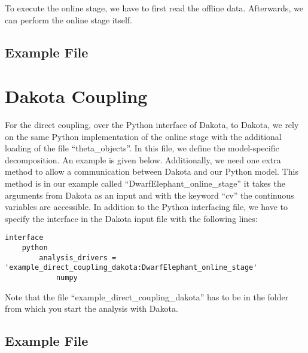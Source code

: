 \documentclass[11pt, a4paper, DIV=14]{scrartcl}
\begin{document}
To execute the online stage, we have to first read the offline data. Afterwards, we can perform the online stage itself.

\subsection{Example File}


\section{Dakota Coupling}
For the direct coupling, over the Python interface of Dakota, to Dakota, we rely on the same Python implementation of the online stage with the additional loading of the file ``theta\_objects''.  In this file, we define the model-specific decomposition. An example is given below. Additionally, we need one extra method to allow a communication between Dakota and our Python model. This method is in our example called ``DwarfElephant\_online\_stage'' it takes the arguments from Dakota as an input and with the keyword ``cv'' the continuous variables are accessible. In addition to the Python interfacing file, we have to specify the interface in the Dakota input file with the following lines:
%
 \begin{lstlisting}
interface
    python
        analysis_drivers = 'example_direct_coupling_dakota:DwarfElephant_online_stage'
            numpy
\end{lstlisting}
%
Note that the file ``example\_direct\_coupling\_dakota'' has to be in the folder from which you start the analysis with Dakota.

\subsection{Example File}
        
        
        
   

\end{document}

